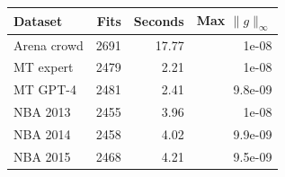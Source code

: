 \begin{tabular}{lrrr}
\toprule
Dataset & Fits & Seconds & Max $\|g\|_\infty$ \\
\midrule
Arena crowd & 2691 & 17.77 & 1e-08 \\
MT expert & 2479 & 2.21 & 1e-08 \\
MT GPT-4 & 2481 & 2.41 & 9.8e-09 \\
NBA 2013 & 2455 & 3.96 & 1e-08 \\
NBA 2014 & 2458 & 4.02 & 9.9e-09 \\
NBA 2015 & 2468 & 4.21 & 9.5e-09 \\
\bottomrule
\end{tabular}
